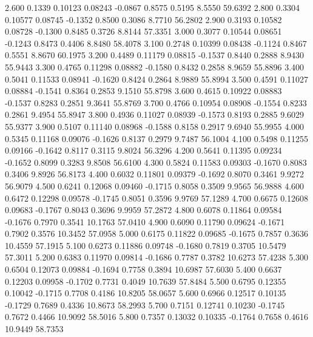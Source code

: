    2.600   0.1339   0.10123   0.08243  -0.0867   0.8575   0.5195   8.5550  59.6392
   2.800   0.3304   0.10577   0.08745  -0.1352   0.8500   0.3086   8.7710  56.2802
   2.900   0.3193   0.10582   0.08728  -0.1300   0.8485   0.3726   8.8144  57.3351
   3.000   0.3077   0.10544   0.08651  -0.1243   0.8473   0.4406   8.8480  58.4078
   3.100   0.2748   0.10399   0.08438  -0.1124   0.8467   0.5551   8.8670  60.1975
   3.200   0.4489   0.11179   0.08815  -0.1537   0.8440   0.2888   8.9430  55.9443
   3.300   0.4765   0.11298   0.08882  -0.1580   0.8432   0.2858   8.9659  55.8896
   3.400   0.5041   0.11533   0.08941  -0.1620   0.8424   0.2864   8.9889  55.8994
   3.500   0.4591   0.11027   0.08884  -0.1541   0.8364   0.2853   9.1510  55.8798
   3.600   0.4615   0.10922   0.08883  -0.1537   0.8283   0.2851   9.3641  55.8769
   3.700   0.4766   0.10954   0.08908  -0.1554   0.8233   0.2861   9.4954  55.8947
   3.800   0.4936   0.11027   0.08939  -0.1573   0.8193   0.2885   9.6029  55.9377
   3.900   0.5107   0.11140   0.08968  -0.1588   0.8158   0.2917   9.6940  55.9955
   4.000   0.5345   0.11168   0.09076  -0.1626   0.8137   0.2979   9.7487  56.1004
   4.100   0.5498   0.11255   0.09166  -0.1642   0.8117   0.3115   9.8024  56.3296
   4.200   0.5641   0.11395   0.09234  -0.1652   0.8099   0.3283   9.8508  56.6100
   4.300   0.5824   0.11583   0.09303  -0.1670   0.8083   0.3406   9.8926  56.8173
   4.400   0.6032   0.11801   0.09379  -0.1692   0.8070   0.3461   9.9272  56.9079
   4.500   0.6241   0.12068   0.09460  -0.1715   0.8058   0.3509   9.9565  56.9888
   4.600   0.6472   0.12298   0.09578  -0.1745   0.8051   0.3596   9.9769  57.1289
   4.700   0.6675   0.12608   0.09683  -0.1767   0.8043   0.3696   9.9959  57.2872
   4.800   0.6078   0.11864   0.09584  -0.1676   0.7970   0.3541  10.1763  57.0410
   4.900   0.6090   0.11790   0.09624  -0.1671   0.7902   0.3576  10.3452  57.0958
   5.000   0.6175   0.11822   0.09685  -0.1675   0.7857   0.3636  10.4559  57.1915
   5.100   0.6273   0.11886   0.09748  -0.1680   0.7819   0.3705  10.5479  57.3011
   5.200   0.6383   0.11970   0.09814  -0.1686   0.7787   0.3782  10.6273  57.4238
   5.300   0.6504   0.12073   0.09884  -0.1694   0.7758   0.3894  10.6987  57.6030
   5.400   0.6637   0.12203   0.09958  -0.1702   0.7731   0.4049  10.7639  57.8484
   5.500   0.6795   0.12355   0.10042  -0.1715   0.7708   0.4186  10.8205  58.0657
   5.600   0.6966   0.12517   0.10135  -0.1729   0.7689   0.4336  10.8673  58.2993
   5.700   0.7151   0.12741   0.10230  -0.1745   0.7672   0.4466  10.9092  58.5016
   5.800   0.7357   0.13032   0.10335  -0.1764   0.7658   0.4616  10.9449  58.7353
